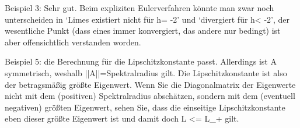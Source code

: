 Beispiel 3: Sehr gut. Beim expliziten Eulerverfahren könnte man zwar noch unterscheiden in ‘Limes existiert nicht für h\lambda = -2’ und ‘divergiert für h\lambda < -2’, der wesentliche Punkt (dass eines immer konvergiert, das andere nur bedingt) ist aber offensichtlich verstanden worden.

Beispiel 5: die Berechnung für die Lipschitzkonstante passt. Allerdings ist A symmetrisch, weshalb ||A||=Spektralradius gilt. Die Lipschitzkonstante ist also der betragsmäßig größte Eigenwert. Wenn Sie die Diagonalmatrix der Eigenwerte nicht mit dem (positiven) Spektralradius abschätzen, sondern mit dem (eventuell negativen) größten Eigenwert, sehen Sie, dass die einseitige Lipschitzkonstante eben dieser größte Eigenwert ist und damit doch L <= L_+ gilt.
